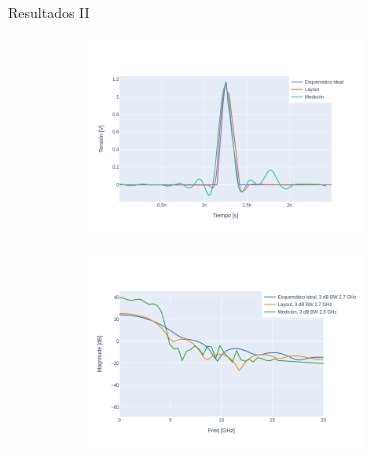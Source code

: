 \documentclass{beamer}
\begin{document}
\begin{frame}{Resultados II}
    \begin{figure}[t!]
        \centering
        \begin{subfigure}[b]{0.49\textwidth}
            \centering
            \includegraphics[width=0.8\textwidth]{images/plots/Vcc_7V_duty_70_time_domain.png}
            \label{fig:pulses_7v_70}
        \end{subfigure}
        \hfill
        \begin{subfigure}[b]{0.49\textwidth}
            \centering
            \includegraphics[width=0.8\textwidth]{images/plots/Vcc_7V_duty_70_psd.png}
            \label{fig:psd_7v_70}
        \end{subfigure}
        \label{fig:plots_7v_70}
    \end{figure}

\end{frame}
\end{document}
